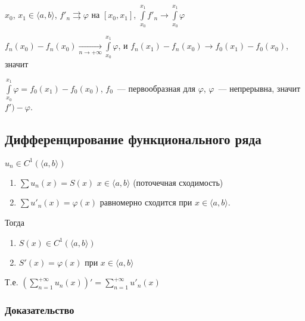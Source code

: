 \documentclass{article}
\begin{document}
            $x_0$, $x_1 \in \langle a, b \rangle$, $f'_n \rightrightarrows \varphi$ на $[x_0, x_1]$, $\int\limits^{x_1}_{x_0} f'_n \rightarrow \int\limits^{x_1}_{x_0} \varphi$
            
            $f_n(x_0) - f_n(x_0) \xrightarrow[n \rightarrow +\infty]{} \int\limits^{x_1}_{x_0} \varphi$, и $f_n(x_1) - f_n(x_0) \rightarrow f_0(x_1) - f_0(x_0)$, значит
            
            $\int\limits^{x_1}_{x_0} \varphi = f_0(x_1) - f_0(x_0)$, $f_0$~--- первообразная для $\varphi$, $\varphi$~--- непрерывна, значит $f') - \varphi$.
            
        \subsection{Дифференцирование функционального ряда}
        
            $u_n \in C^1 \left( \langle a, b \rangle \right)$
            
            \begin{enumerate}
            
                \item $\sum u_n(x) = S(x)$ $x \in \langle a, b \rangle$ (поточечная сходимость)
                
                \item $\sum u'_n(x) = \varphi(x)$ равномерно сходится при $x \in \langle a, b \rangle$.
            
            \end{enumerate}
            
            Тогда
                
            \begin{enumerate}
                
                \item $S(x) \in C^1 \left( \langle a, b \rangle \right)$
                    
                \item $S'(x) = \varphi(x)$ при $x \in \langle a, b \rangle$
                    
            \end{enumerate}
                
            Т.е. $\left( \sum\limits^{+\infty}_{n = 1} u_n(x) \right)' = \sum\limits^{+\infty}_{n = 1} u'_n(x)$
            
        \subsubsection{Доказательство}
            
\end{document}
